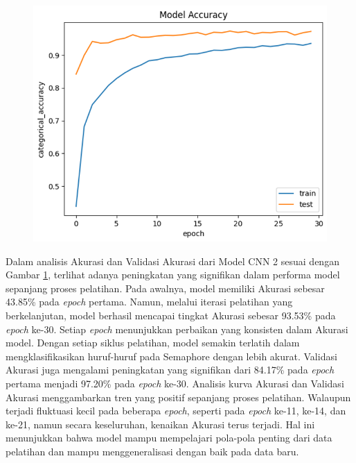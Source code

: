 \begin{figure}[!hbt]
	\centering
	\includegraphics[width=0.7\linewidth]{gambar/bener/Accuracy_ModelCNN2.png}
	\label{fig:AkurasiCNNKedua}
\end{figure}

Dalam analisis Akurasi dan Validasi Akurasi dari Model CNN 2 sesuai dengan Gambar \ref{fig:AkurasiCNNKedua}, terlihat adanya peningkatan yang signifikan dalam performa model sepanjang proses pelatihan. Pada awalnya, model memiliki Akurasi sebesar 43.85\% pada \textit{epoch} pertama. Namun, melalui iterasi pelatihan yang berkelanjutan, model berhasil mencapai tingkat Akurasi sebesar 93.53\% pada \textit{epoch} ke-30. Setiap \textit{epoch} menunjukkan perbaikan yang konsisten dalam Akurasi model. Dengan setiap siklus pelatihan, model semakin terlatih dalam mengklasifikasikan huruf-huruf pada Semaphore dengan lebih akurat. Validasi Akurasi juga mengalami peningkatan yang signifikan dari 84.17\% pada \textit{epoch} pertama menjadi 97.20\% pada \textit{epoch} ke-30. Analisis kurva Akurasi dan Validasi Akurasi menggambarkan tren yang positif sepanjang proses pelatihan. Walaupun terjadi fluktuasi kecil pada beberapa \textit{epoch}, seperti pada \textit{epoch} ke-11, ke-14, dan ke-21, namun secara keseluruhan, kenaikan Akurasi terus terjadi. Hal ini menunjukkan bahwa model mampu mempelajari pola-pola penting dari data pelatihan dan mampu menggeneralisasi dengan baik pada data baru.

